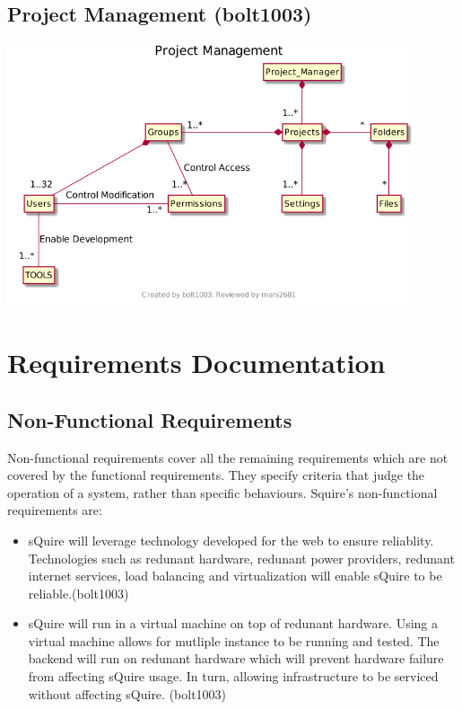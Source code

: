 \documentclass[11pt]{report}
\begin{document}
\section{Project Management (bolt1003)}
    \begin{minipage}{1\textwidth}
        \begin{center}
            \includegraphics[width=0.9\textwidth]{diagrams/class-projectmanagement}
        \end{center}
    \end{minipage}

\chapter{Requirements Documentation}

\section{Non-Functional Requirements}
    Non-functional requirements cover all the remaining requirements which are not covered by the functional requirements. They specify criteria that judge the operation of a system, rather than specific behaviours. Squire's non-functional requirements are:
    \begin{itemize}
         \item sQuire will leverage technology developed for the web to ensure reliablity. Technologies such as redunant hardware, redunant power providers, redunant internet services, load balancing and virtualization will enable sQuire to be reliable.(bolt1003)
         \item sQuire will run in a virtual machine on top of redunant hardware. Using a virtual machine allows for mutliple instance to be running and tested. The backend will run on redunant hardware which will prevent hardware failure from affecting sQuire usage. In turn, allowing infrastructure to be serviced without affecting sQuire. (bolt1003)
    \end{itemize}
\end{document}
